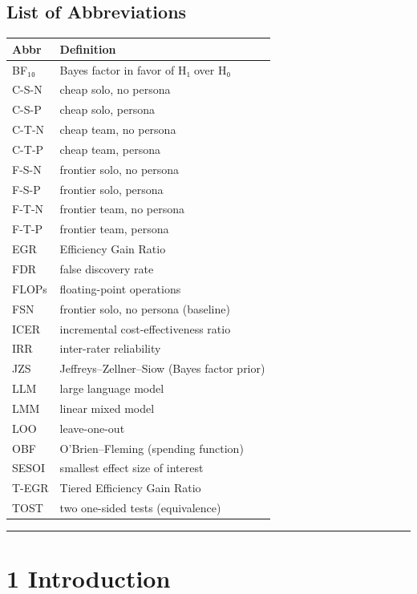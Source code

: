 \documentclass[11pt,a4paper]{article}
\begin{document}
\subsection{List of Abbreviations}

\begin{table}[htbp]
\centering
\begin{tabular}{ll}
\toprule
Abbr & Definition \\
\midrule
BF₁₀ & Bayes factor in favor of H₁ over H₀ \\
C-S-N & cheap solo, no persona \\
C-S-P & cheap solo, persona \\
C-T-N & cheap team, no persona \\
C-T-P & cheap team, persona \\
F-S-N & frontier solo, no persona \\
F-S-P & frontier solo, persona \\
F-T-N & frontier team, no persona \\
F-T-P & frontier team, persona \\
EGR & Efficiency Gain Ratio \\
FDR & false discovery rate \\
FLOPs & floating-point operations \\
FSN & frontier solo, no persona (baseline) \\
ICER & incremental cost-effectiveness ratio \\
IRR & inter-rater reliability \\
JZS & Jeffreys–Zellner–Siow (Bayes factor prior) \\
LLM & large language model \\
LMM & linear mixed model \\
LOO & leave-one-out \\
OBF & O'Brien–Fleming (spending function) \\
SESOI & smallest effect size of interest \\
T-EGR & Tiered Efficiency Gain Ratio \\
TOST & two one-sided tests (equivalence) \\
\bottomrule
\end{tabular}
\end{table}


\hrule


\section{1 Introduction}
\end{document}
